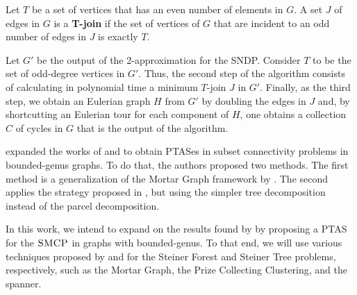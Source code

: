 Let \(T\) be a set of vertices that has an even number of elements in \(G\). A set \(J\) of edges in \(G\) is a \textbf{T-join} if the set of vertices of \(G\) that are incident to an odd number of edges in \(J\) is exactly \(T\).

Let \(G'\) be the output of the 2-approximation for the SNDP. Consider \(T\) to be the set of odd-degree vertices in \(G'\). Thus, the second step of the algorithm consists of calculating in polynomial time a minimum \(T\)-join \(J\) in \(G'\). Finally, as the third step, we obtain an Eulerian graph \(H\) from \(G'\) by doubling the edges in \(J\) and, by shortcutting an Eulerian tour for each component of \(H\), one obtains a collection \(C\) of cycles in \(G\) that is the output of the algorithm.


\cite{Borradaile2012} expanded the works of \cite{Borradaile2009b} and \cite{KleinTSP} to obtain PTASes in subset connectivity problems in bounded-genus graphs. To do that, the authors proposed two methods. The first method is a generalization of the Mortar Graph framework by \cite{KleinTSP}. The second applies the strategy proposed in \cite{Borradaile2009b}, but using the simpler tree decomposition instead of the parcel decomposition.


In this work, we intend to expand on the results found by \cite{LINTZMAYER2020134} by proposing a PTAS for the \(\textsc{SMCP}\) in graphs with bounded-genus. To that end, we will use various techniques proposed by \cite{Bateni} and \cite{Borradaile2009b} for the Steiner Forest and Steiner Tree problems, respectively, such as the Mortar Graph, the Prize Collecting Clustering, and the spanner.
